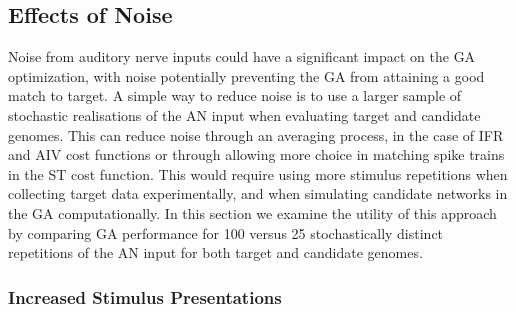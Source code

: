 % 
% 
% 




\subsection{Effects of Noise}

Noise from auditory nerve inputs could have a significant impact on
the GA optimization, with noise potentially preventing the GA from
attaining a good match to target. A simple way to reduce noise is to
use a larger sample of stochastic realisations of the AN input when
evaluating target and candidate genomes. This can reduce noise through
an averaging process, in the case of IFR and AIV cost functions or
through allowing more choice in matching spike trains in the ST cost
function. This would require using more stimulus repetitions when
collecting target data experimentally, and when simulating candidate
networks in the GA computationally. In this section we examine the
utility of this approach by comparing GA performance for 100 versus 25
stochastically distinct repetitions of the AN input for both target
and candidate genomes.

\medskip{}


\subsubsection{Increased Stimulus Presentations}


